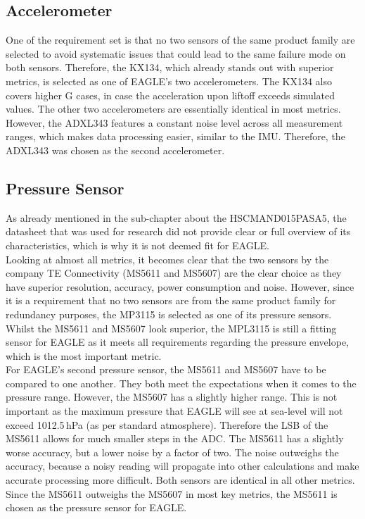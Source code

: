 \documentclass[fontsize=11pt,%
twoside,%
BCOR          = 8mm, %
DIV           = 11,  %
titlepage     = off,%
index=totoc,%
xcolor        = pdftex,%
dvipsnames,%
bibliography  = totoc,%
bibliography = numbered, %
listof        = notnumbered]{scrreprt}
\begin{document}
\subsection{Accelerometer}
One of the requirement set is that no two sensors of the same product family are selected to avoid systematic issues that could lead to the same failure mode on both sensors. Therefore, the KX134, which already stands out with superior metrics, is selected as one of EAGLE's two accelerometers. The KX134 also covers higher G cases, in case the acceleration upon liftoff exceeds simulated values. The other two accelerometers are essentially identical in most metrics. However, the ADXL343 features a constant noise level across all measurement ranges, which makes data processing easier, similar to the IMU. Therefore, the ADXL343 was chosen as the second accelerometer.

\subsection{Pressure Sensor}
As already mentioned in the sub-chapter about the HSCMAND015PASA5, the datasheet that was used for research did not provide clear or full overview of its characteristics, which is why it is not deemed fit for EAGLE.\\
Looking at almost all metrics, it becomes clear that the two sensors by the company TE Connectivity (MS5611 and MS5607) are the clear choice as they have superior resolution, accuracy, power consumption and noise. However, since it is a requirement that no two sensors are from the same product family for redundancy purposes, the MP3115 is selected as one of its pressure sensors. Whilst the MS5611 and MS5607 look superior, the MPL3115 is still a fitting sensor for EAGLE as it meets all requirements regarding the pressure envelope, which is the most important metric.\\
For EAGLE's second pressure sensor, the MS5611 and MS5607 have to be compared to one another. They both meet the expectations when it comes to the pressure range. However, the MS5607 has a slightly higher range. This is not important as the maximum pressure that EAGLE will see at sea-level will not exceed 1012.5\,hPa (as per standard atmosphere). Therefore the LSB of the MS5611 allows for much smaller steps in the ADC. The MS5611 has a slightly worse accuracy, but a lower noise by a factor of two. The noise outweighs the accuracy, because a noisy reading will propagate into other calculations and make accurate processing more difficult. Both sensors are identical in all other metrics.\\
Since the MS5611 outweighs the MS5607 in most key metrics, the MS5611 is chosen as the pressure sensor for EAGLE.
\newpage
\end{document}
